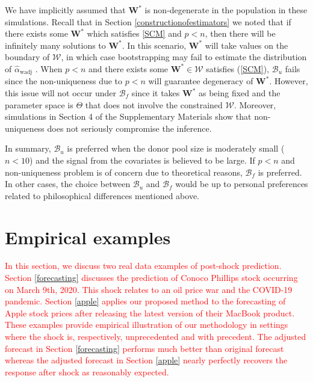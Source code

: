 \documentclass[11pt,3p,review,authoryear]{elsarticle}
\def\mbf#1{\mathbf{#1}} %
\def\mrm#1{\mathrm{#1}} %
\def\mc#1{\mathcal{#1}} %
\theoremstyle{definition}
\begin{document}
 
We have implicitly assumed that $\mathbf{W}^*$ is non-degenerate in the population in these simulations.  Recall that in Section \ref{constructionofestimators} we noted that if there exists some $\mathbf{W}^*$ which satisfies \eqref{SCM} and $p < n$, then there will be infinitely many solutions to $\mathbf{W}^*$. In this scenario, $\mathbf{W}^*$ will take values on the boundary of $\mc{W}$, in which case bootstrapping may fail to estimate the distribution of $\hat{\alpha}_{\mrm{wadj}}$ \citep{andrews2000inconsistency}.  When $p < n$ and there exists some $\mathbf{W}^*\in \mc{W}$ satisfies (\ref{SCM}), $\mc{B}_u$ fails since the non-uniqueness due to $p < n$ will guarantee degeneracy of  $\mathbf{W}^*$. However, this issue will not occur under $\mc{B}_f$ since it takes $\mbf{W}^*$ as being fixed and the parameter space is $\Theta$ that does not involve the constrained $\mc{W}$. Moreover, simulations in Section 4 of the Supplementary Materials show that non-uniqueness does not seriously compromise the inference. 



In summary, $\mathcal{B}_u$ is preferred when  the donor pool size is moderately small ($n< 10$) and the signal from the covariates is believed to be large. If $p < n$ and non-uniqueness problem is of concern due to theoretical reasons,  $\mathcal{B}_f$ is preferred. In other cases, the choice between  $\mathcal{B}_u$  and  $\mathcal{B}_f$ would be up to personal preferences related to philosophical differences mentioned above.

\section{Empirical examples}

\textcolor{red}{In this section, we discuss two real data examples of post-shock prediction. Section \ref{forecasting} discusses the prediction of Conoco Phillips stock occurring on March 9th, 2020. This shock relates to an oil price war and the COVID-19 pandemic. Section \ref{apple} applies our proposed method to the forecasting of Apple stock prices after releasing the latest version of their MacBook product. These examples provide empirical illustration of our methodology in settings where the shock is, respectively, unprecedented and with precedent. The adjusted forecast in Section \ref{forecasting} performs much better than original forecast whereas the adjusted forecast in Section \ref{apple} nearly perfectly recovers the response after shock as reasonably expected. }
\end{document}
